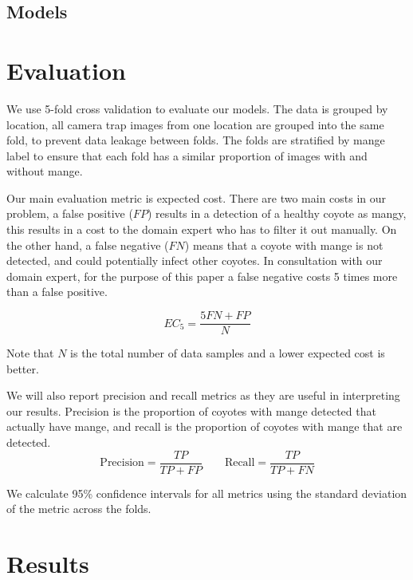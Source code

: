 \documentclass{article}
\begin{document}
\subsection{Models}

\section{Evaluation} \label{sec:evaluation}
We use 5-fold cross validation to evaluate our models. The data is grouped by
location, all camera trap images from one location are grouped into the same
fold, to prevent data leakage between folds. The folds are stratified by mange
label to ensure that each fold has a similar proportion of images with and
without mange.

Our main evaluation metric is expected cost. There are two main costs in our
problem, a false positive ($FP$) results in a detection of a healthy coyote as
mangy, this results in a cost to the domain expert who has to filter it out
manually. On the other hand, a false negative ($FN$) means that a coyote with
mange is not detected, and could potentially infect other coyotes. In
consultation with our domain expert, for the purpose of this paper a false
negative costs 5 times more than a false positive.

\begin{equation}
  EC_5 = \frac{5FN + FP}{N}
\end{equation}

Note that $N$ is the total number of data samples and a lower expected cost is
better.

We will also report precision and recall metrics as they are useful in
interpreting our results. Precision is the proportion of coyotes with mange
detected that actually have mange, and recall is the proportion of coyotes with
mange that are detected.
\begin{equation}
  \text{Precision} = \frac{TP}{TP+FP} \qquad \text{Recall} = \frac{TP}{TP+FN}
\end{equation}

We calculate 95\% confidence intervals for all metrics using the standard
deviation of the metric across the folds.

\section{Results} \label{sec:results}
\end{document}
